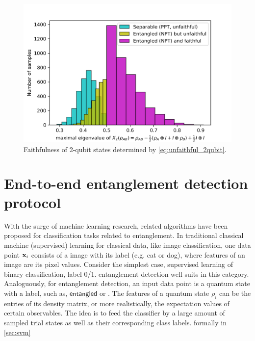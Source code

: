 \documentclass[
reprint,
aps,
pra,
floatfix,
]{revtex4-2}
\theoremstyle{plain}
\theoremstyle{definition}
\newcommand{\dm}{\rho}
\newcommand{\entangled}{\textsf{entangled}}
\begin{document}
\begin{figure}[!ht]
	\centering
	\includegraphics[width=.9\linewidth]{./Code/faithfulness_2_qubit.png}
	\caption{Faithfulness of 2-qubit states determined by \cref{eq:unfaithful_2qubit}.}
\end{figure}


\section{End-to-end entanglement detection protocol}\label{sec:protocol}
With the surge of machine learning research, related algorithms have been proposed for classification tasks related to entanglement.
In traditional classical machine (supervised) learning for classical data, like image classification, 
one data point $\vb{x}_i$ consists of a image with its label (e.g. \textsf{cat} or \textsf{dog}), where features of an image are its pixel values.
Consider the simplest case, supervised learning of binary classification, label 0/1.
entanglement detection well suits in this category.
Analoguously, for entanglement detection, an input data point is a quantum state with a label, such as, $\entangled$ or .
The features of a quantum state $\dm_i$ can be the entries of its density matrix, or more realistically, the expectation values of certain observables.
The idea is to feed the classifier by a large amount of sampled trial states
as well as their corresponding class labels.
formally in \cref{sec:svm}
\end{document}
